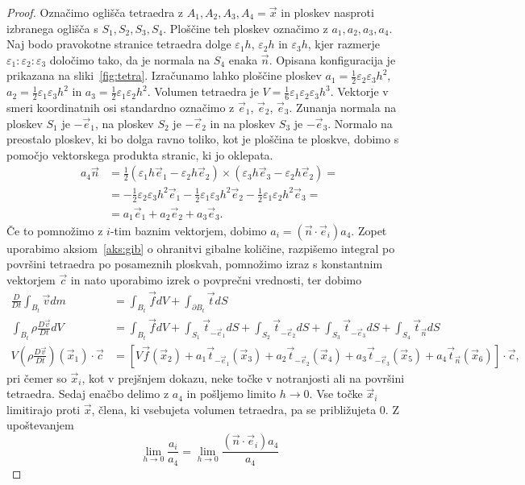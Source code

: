 \documentclass[12pt,a4paper,twoside]{article}
\theoremstyle{definition} %
\theoremstyle{plain} %
\numberwithin{equation}{section}
\newcommand{\eps}{\varepsilon}
\newcommand{\DD}[2]{\ensuremath{\frac{D #1}{D #2}}}
\newcommand{\DDt}[1]{\DD{#1}{t}}
\newcommand{\vv}{\vec{v}}
\newcommand{\vt}{\vec{t}}
\newcommand{\vc}{\vec{c}}
\newcommand{\vn}{\vec{n}}
\newcommand{\vf}{\vec{f}}
\newcommand{\vx}{\vec{x}}
\newcommand{\ei}{\vec{e}_1}
\newcommand{\ej}{\vec{e}_2}
\newcommand{\ek}{\vec{e}_3}
\begin{document}
\begin{proof}
Označimo oglišča tetraedra z $A_1, A_2, A_3, A_4 = \vx$ in ploskev nasproti izbranega oglišča s
$S_1, S_2, S_3, S_4$. Ploščine teh ploskev označimo z $a_1, a_2, a_3, a_4$. Naj bodo pravokotne
stranice tetraedra dolge $\eps_1 h$, $\eps_2 h$ in $\eps_3 h$, kjer razmerje $\eps_1 : \eps_2 :
\eps_3$ določimo tako, da je normala na $S_4$ enaka $\vn$. Opisana konfiguracija je prikazana na
sliki~\ref{fig:tetra}. Izračunamo lahko ploščine ploskev $a_1 = \frac12 \eps_2\eps_3h^2$,
$a_2 = \frac12 \eps_1\eps_3h^2$ in $a_3 = \frac12 \eps_1\eps_2h^2$. Volumen tetraedra je $V =
\frac16 \eps_1\eps_2\eps_3h^3$. Vektorje v smeri koordinatnih osi standardno označimo z $\ei$,
$\ej$, $\ek$. Zunanja normala na ploskev $S_1$ je $-\ei$, na ploskev $S_2$ je $-\ej$ in na ploskev
$S_3$ je $-\ek$. Normalo na preostalo ploskev, ki bo dolga ravno toliko, kot je ploščina te ploskve,
dobimo s pomočjo vektorskega produkta stranic, ki jo oklepata.
\begin{align*}
  a_4\vn &= \frac12 (\eps_1h \ei - \eps_2h \ej) \times (\eps_3h \ek - \eps_2h
  \ej) = \\ &=
  -\frac12 \eps_2\eps_3 h^2\ei
  -\frac12 \eps_1\eps_3 h^2\ej
  -\frac12 \eps_1\eps_2 h^2\ek = \\
  &= a_1 \ei + a_2 \ej + a_3 \ek.
\end{align*}
Če to pomnožimo z $i$-tim baznim vektorjem, dobimo $a_i = (\vn\cdot\vec{e}_i)
a_4$.
Zopet uporabimo aksiom~\ref{aks:gib} o ohranitvi gibalne količine, razpišemo integral po površini
tetraedra po posameznih ploskvah, pomnožimo izraz s konstantnim vektorjem $\vc$ in nato uporabimo
izrek o povprečni vrednosti, ter dobimo
\begin{align*}
  \DDt{} \int_{B_t} \vv dm &= \int_{B_t} \vf dV + \int_{\partial {B_t}} \vt dS \\
\int_{B_t} \rho\DDt{\vv} dV &= \int_{B_t} \vf dV +
  \int_{S_1} \vt_{-\ei} dS +
  \int_{S_2} \vt_{-\ej} dS +
  \int_{S_3} \vt_{-\ek} dS +
  \int_{S_4} \vt_{\vn} dS
  \\
  V (\rho\DDt{\vv})(\vx_1)\cdot\vc &= \left[V \vf(\vx_2) +
  a_1 \vt_{-\ei}(\vx_3) + a_2 \vt_{-\ej}(\vx_4) + a_3 \vt_{-\ek}(\vx_5) + a_4
\vt_{\vn}(\vx_6)\right]\cdot \vc,
\end{align*}
pri čemer so $\vx_i$, kot v prejšnjem dokazu, neke točke v notranjosti ali na
površini tetraedra. Sedaj enačbo delimo z $a_4$ in pošljemo limito $h \to 0$.
Vse točke $\vx_i$ limitirajo proti $\vx$, člena, ki vsebujeta volumen tetraedra,
pa se približujeta 0. Z upoštevanjem
\[
  \lim_{h\to0} \frac{a_i}{a_4} = \lim_{h\to0}\frac{(\vn\cdot\vec{e}_i) a_4}{a_4}
\]
\end{proof}
\end{document}
